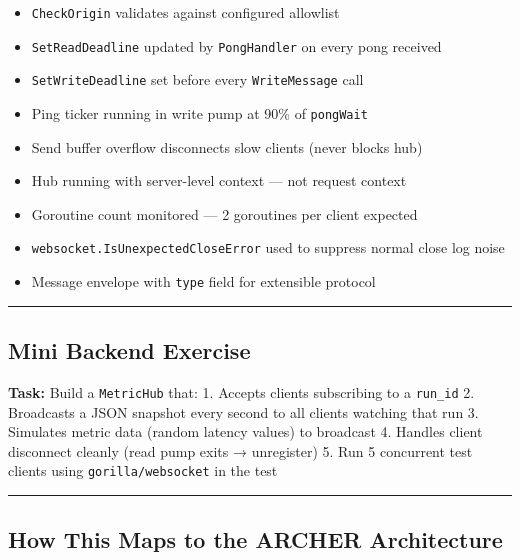\documentclass[
]{article}
\providecommand{\tightlist}{%
  \setlength{\itemsep}{0pt}\setlength{\parskip}{0pt}}
\begin{document}
\begin{itemize}
\tightlist
\item[$\square$]
  \texttt{CheckOrigin} validates against configured allowlist
\item[$\square$]
  \texttt{SetReadDeadline} updated by \texttt{PongHandler} on every pong
  received
\item[$\square$]
  \texttt{SetWriteDeadline} set before every \texttt{WriteMessage} call
\item[$\square$]
  Ping ticker running in write pump at 90\% of \texttt{pongWait}
\item[$\square$]
  Send buffer overflow disconnects slow clients (never blocks hub)
\item[$\square$]
  Hub running with server-level context --- not request context
\item[$\square$]
  Goroutine count monitored --- 2 goroutines per client expected
\item[$\square$]
  \texttt{websocket.IsUnexpectedCloseError} used to suppress normal
  close log noise
\item[$\square$]
  Message envelope with \texttt{type} field for extensible protocol
\end{itemize}

\begin{center}\rule{0.5\linewidth}{0.5pt}\end{center}

\hypertarget{mini-backend-exercise-1}{%
\subsection{Mini Backend Exercise}\label{mini-backend-exercise-1}}

\textbf{Task:} Build a \texttt{MetricHub} that: 1. Accepts clients
subscribing to a \texttt{run\_id} 2. Broadcasts a JSON snapshot every
second to all clients watching that run 3. Simulates metric data (random
latency values) to broadcast 4. Handles client disconnect cleanly (read
pump exits → unregister) 5. Run 5 concurrent test clients using
\texttt{gorilla/websocket} in the test

\begin{center}\rule{0.5\linewidth}{0.5pt}\end{center}

\hypertarget{how-this-maps-to-the-archer-architecture-1}{%
\subsection{How This Maps to the ARCHER
Architecture}\label{how-this-maps-to-the-archer-architecture-1}}
\end{document}
